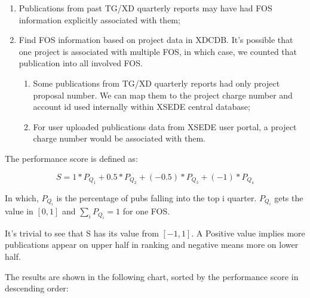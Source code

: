 \documentclass{sig-alternate}
\begin{document}
\begin{enumerate}

\item Publications from past TG/XD quarterly reports may have had
  FOS information explicitly associated with them;

\item Find FOS information based on project data in XDCDB. It's
  possible that one project is associated with multiple FOS, in which
  case, we counted that publication into all involved FOS.

\begin{enumerate}

\item Some publications from TG/XD quarterly reports had only project
  proposal number. We can map them to the project charge number and
  account id used internally within XSEDE central database;

\item For user uploaded publications data from XSEDE user portal, a
  project charge number would be associated with them.

\end{enumerate}

\end{enumerate}

The performance score is defined as:

\[	S = 1*P_{Q_1} + 0.5*P_{Q_2}+ (-0.5)*P_{Q_3} + (-1)*P_{Q_4} \]

In which, $P_{Q_i}$ is the percentage of pubs falling into the top i
quarter. $P_{Q_i}$ gets the value in $[0,1]$ and
$\sum_{i} {P_{Q_i}} = 1$ for one FOS.

It's trivial to see that S has its value from $[-1, 1]$. A Positive
value implies more publications appear on upper half in ranking and
negative means more on lower half.

The results are shown in the following chart, sorted by the
performance score in descending order:
\end{document}
